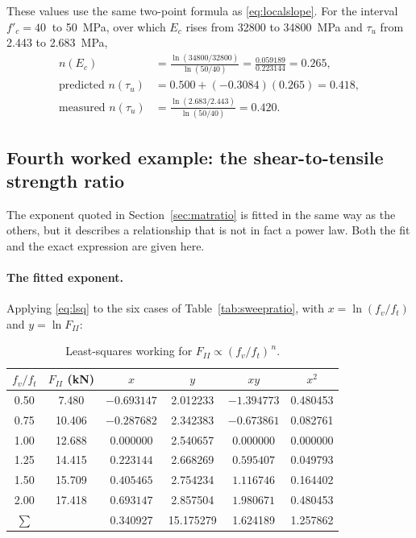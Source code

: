 These values use the same two-point formula as
\eqref{eq:localslope}. For the interval $f'_c = \SI{40}{}$ to
\SI{50}{\mega\pascal}, over which $E_c$ rises from \SI{32800}{} to
\SI{34800}{\mega\pascal} and $\tau_u$ from \SI{2.443}{} to
\SI{2.683}{\mega\pascal},
\begin{align}
n(E_c) &= \frac{\ln(34800/32800)}{\ln(50/40)}
        = \frac{0.059189}{0.223144} = 0.265 , \\[2pt]
\text{predicted } n(\tau_u) &= 0.500 + (-0.3084)(0.265) = 0.418 , \\[2pt]
\text{measured } n(\tau_u) &= \frac{\ln(2.683/2.443)}{\ln(50/40)}
        = 0.420 .
\end{align}

\subsection*{Fourth worked example: the shear-to-tensile strength ratio}

The exponent quoted in Section~\ref{sec:matratio} is fitted in the same
way as the others, but it describes a relationship that is not in fact a
power law. Both the fit and the exact expression are given here.

\paragraph{The fitted exponent.}
Applying \eqref{eq:lsq} to the six cases of Table~\ref{tab:sweepratio},
with $x = \ln(f_v/f_t)$ and $y = \ln F_{II}$:

\begin{table}[H]
\centering
\caption{Least-squares working for $F_{II} \propto (f_v/f_t)^{\,n}$.}
\label{tab:lsqfv}
\small
\begin{tabular*}{\linewidth}{@{\extracolsep{\fill}}cccccc@{}}
\hline
$f_v/f_t$ & $F_{II}$ (kN) & $x$ & $y$ & $xy$ & $x^2$ \\
\hline
0.50 & 7.480  & $-0.693147$ & 2.012233 & $-1.394773$ & 0.480453 \\
0.75 & 10.406 & $-0.287682$ & 2.342383 & $-0.673861$ & 0.082761 \\
1.00 & 12.688 & $ 0.000000$ & 2.540657 & $ 0.000000$ & 0.000000 \\
1.25 & 14.415 & $ 0.223144$ & 2.668269 & $ 0.595407$ & 0.049793 \\
1.50 & 15.709 & $ 0.405465$ & 2.754234 & $ 1.116746$ & 0.164402 \\
2.00 & 17.418 & $ 0.693147$ & 2.857504 & $ 1.980671$ & 0.480453 \\
\hline
$\sum$ & & 0.340927 & 15.175279 & 1.624189 & 1.257862 \\
\hline
\end{tabular*}
\end{table}

